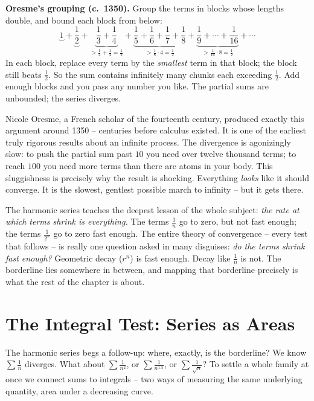 \begin{focusbox}
\textbf{Oresme's grouping (c.~1350).} Group the terms in blocks whose lengths double, and bound each block from below:
\[
\underbrace{1}_{} + \underbrace{\frac12}_{} + \underbrace{\frac13 + \frac14}_{> \frac14 + \frac14 = \frac12} + \underbrace{\frac15 + \frac16 + \frac17 + \frac18}_{> \frac18\cdot 4 = \frac12} + \underbrace{\frac19 + \cdots + \frac1{16}}_{> \frac{1}{16}\cdot 8 = \frac12} + \cdots
\]
In each block, replace every term by the \emph{smallest} term in that block; the block still beats $\tfrac12$. So the sum contains infinitely many chunks each exceeding $\tfrac12$. Add enough blocks and you pass any number you like. The partial sums are unbounded; the series diverges.
\end{focusbox}

\begin{historybox}
Nicole Oresme, a French scholar of the fourteenth century, produced exactly this argument around 1350 -- centuries before calculus existed. It is one of the earliest truly rigorous results about an infinite process. The divergence is agonizingly slow: to push the partial sum past $10$ you need over twelve thousand terms; to reach $100$ you need more terms than there are atoms in your body. This sluggishness is precisely why the result is shocking. Everything \emph{looks} like it should converge. It is the slowest, gentlest possible march to infinity -- but it gets there.
\end{historybox}

\begin{aestheticbox}
The harmonic series teaches the deepest lesson of the whole subject: \emph{the rate at which terms shrink is everything.} The terms $\tfrac1n$ go to zero, but not fast enough; the terms $\tfrac{1}{2^n}$ go to zero fast enough. The entire theory of convergence -- every test that follows -- is really one question asked in many disguises: \emph{do the terms shrink fast enough?} Geometric decay ($r^n$) is fast enough. Decay like $\tfrac1n$ is not. The borderline lies somewhere in between, and mapping that borderline precisely is what the rest of the chapter is about.
\end{aestheticbox}

\section{The Integral Test: Series as Areas}
\label{ch29:integral-test}

The harmonic series begs a follow-up: where, exactly, is the borderline? We know $\sum \tfrac1n$ diverges. What about $\sum \tfrac{1}{n^2}$, or $\sum \tfrac{1}{n^{1.5}}$, or $\sum \tfrac{1}{\sqrt n}$? To settle a whole family at once we connect sums to integrals -- two ways of measuring the same underlying quantity, area under a decreasing curve.

